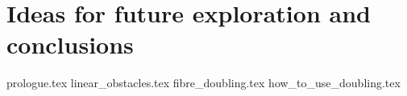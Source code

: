 \documentclass[class=article, crop=false]{standalone}
\begin{document}
\chapter{Ideas for future exploration and conclusions}

{prologue.tex}
{linear_obstacles.tex}
{fibre_doubling.tex}
{how_to_use_doubling.tex}
\end{document}
